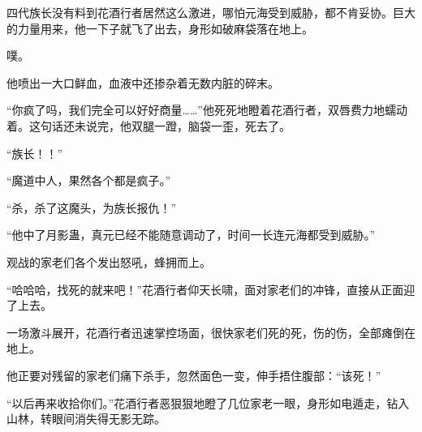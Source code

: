 \begin{this_body}
四代族长没有料到花酒行者居然这么激进，哪怕元海受到威胁，都不肯妥协。巨大的力量用来，他一下子就飞了出去，身形如破麻袋落在地上。

噗。

他喷出一大口鲜血，血液中还掺杂着无数内脏的碎末。

“你疯了吗，我们完全可以好好商量……”他死死地瞪着花酒行者，双唇费力地蠕动着。这句话还未说完，他双腿一蹬，脑袋一歪，死去了。

“族长！！”

“魔道中人，果然各个都是疯子。”

“杀，杀了这魔头，为族长报仇！”

“他中了月影蛊，真元已经不能随意调动了，时间一长连元海都受到威胁。”

观战的家老们各个发出怒吼，蜂拥而上。

“哈哈哈，找死的就来吧！”花酒行者仰天长啸，面对家老们的冲锋，直接从正面迎了上去。

一场激斗展开，花酒行者迅速掌控场面，很快家老们死的死，伤的伤，全部瘫倒在地上。

他正要对残留的家老们痛下杀手，忽然面色一变，伸手捂住腹部：“该死！”

“以后再来收拾你们。”花酒行者恶狠狠地瞪了几位家老一眼，身形如电遁走，钻入山林，转眼间消失得无影无踪。

\end{this_body}

